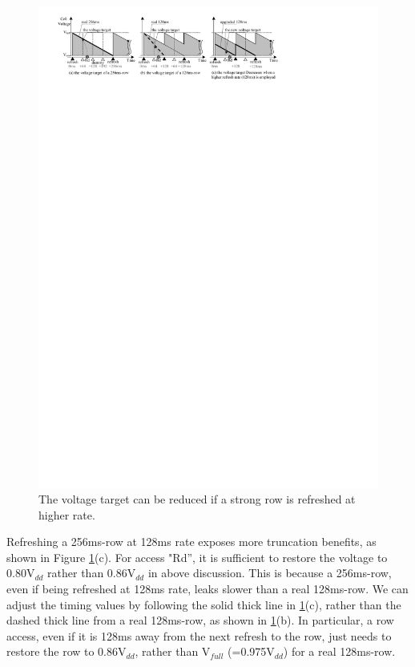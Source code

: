 \begin{figure}[htbp]
\begin{center}
\centering
\includegraphics[width=6.4in]{figures/HPCA16/rt_selective.pdf}
\vspace{-0.2in}
\caption{The voltage target can be reduced if a strong row is refreshed at higher rate.}
\label{fig:rtselective}
\vspace{-0.3in}
\end{center}
\end{figure}

Refreshing a 256ms-row at 128ms rate exposes more truncation benefits, as shown in 
Figure \ref{fig:rtselective}(c). For access "Rd'', it is sufficient to restore the voltage to 0.80V$_{dd}$ rather than 0.86V$_{dd}$ in above discussion. 
This is because a 256ms-row, even if being refreshed at 128ms rate, leaks slower than a real 128ms-row. We can adjust the timing values by following the solid thick line in \ref{fig:rtselective}(c), rather than the dashed thick line from a real 128ms-row, as shown in \ref{fig:rtselective}(b).
In particular, %
a row access, even if it is 128ms away from the next refresh to the row, just needs to restore the row to 0.86V$_{dd}$, rather than V$_{full}$ (=0.975V$_{dd}$) for a real 128ms-row. 

